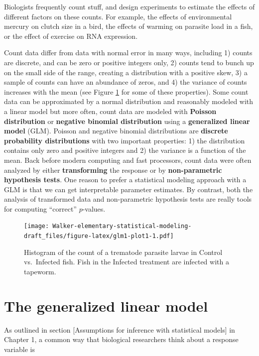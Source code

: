 \documentclass[]{book}
\begin{document}
Biologists frequently count stuff, and design experiments to estimate the effects of different factors on these counts. For example, the effects of environmental mercury on clutch size in a bird, the effects of warming on parasite load in a fish, or the effect of exercise on RNA expression.

Count data differ from data with normal error in many ways, including 1) counts are discrete, and can be zero or positive integers only, 2) counts tend to bunch up on the small side of the range, creating a distribution with a positive skew, 3) a sample of counts can have an abundance of zeros, and 4) the variance of counts increases with the mean (see Figure \ref{fig:glm1-plot1} for some of these properties). Some count data can be approximated by a normal distribution and reasonably modeled with a linear model but more often, count data are modeled with \textbf{Poisson distribution} or \textbf{negative binomial distribution} using a \textbf{generalized linear model} (GLM). Poisson and negative binomial distributions are \textbf{discrete probability distributions} with two important properties: 1) the distribution contains only zero and positive integers and 2) the variance is a function of the mean. Back before modern computing and fast processors, count data were often analyzed by either \textbf{transforming} the response or by \textbf{non-parametric hypothesis tests}. One reason to prefer a statistical modeling approach with a GLM is that we can get interpretable parameter estimates. By contrast, both the analysis of transformed data and non-parametric hypothesis tests are really tools for computing ``correct'' \(p\)-values.

\begin{figure}
\centering
\texttt{[image: Walker-elementary-statistical-modeling-draft\_files/figure-latex/glm1-plot1-1.pdf]}
\caption{\label{fig:glm1-plot1}Histogram of the count of a trematode parasite larvae in Control vs.~Infected fish. Fish in the Infected treatment are infected with a tapeworm.}
\end{figure}

\hypertarget{the-generalized-linear-model}{%
\section{The generalized linear model}\label{the-generalized-linear-model}}

As outlined in section {[}Assumptions for inference with statistical models{]} in Chapter 1, a common way that biological researchers think about a response variable is
\end{document}
